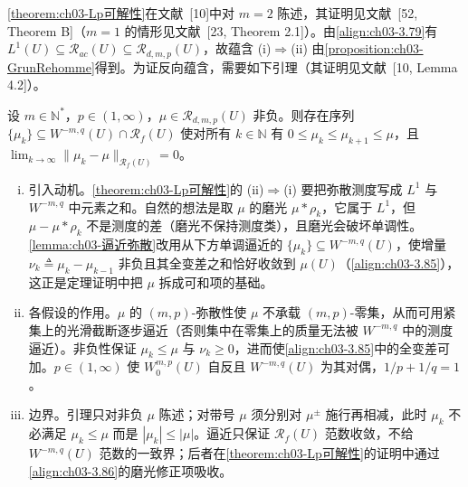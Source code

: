 \documentclass[../../main.tex]{subfiles}%
\begin{document}
\cref{theorem:ch03-Lp可解性}在文献~[10]中对 $m=2$ 陈述，其证明见文献~[52, Theorem B]（$m=1$ 的情形见文献~[23, Theorem 2.1]）。由\eqref{align:ch03-3.79}有 $L^1(U)\subseteq\mathscr{R}_{ac}(U)\subseteq\mathscr{R}_{d,m,p}(U)$，故蕴含 (i)$\Rightarrow$(ii) 由\cref{proposition:ch03-GrunRehomme}得到。为证反向蕴含，需要如下引理（其证明见文献~[10, Lemma 4.2]）。

\begin{lemma}\label{lemma:ch03-逼近弥散}
设 $m\in\mathbb{N}^*$，$p\in(1,\infty)$，$\mu\in\mathscr{R}_{d,m,p}(U)$ 非负。则存在序列 $\{\mu_k\}\subseteq W^{-m,q}(U)\cap\mathscr{R}_f(U)$ 使对所有 $k\in\mathbb{N}$ 有 $0\leqslant\mu_k\leqslant\mu_{k+1}\leqslant\mu$，且 $\lim_{k\to\infty}\|\mu_k-\mu\|_{\mathscr{R}_f(U)}=0$。
\end{lemma}

\begin{remark}\label{remark:ch03-逼近弥散动机}
\begin{enumerate}[(i)]
\item 引入动机。\cref{theorem:ch03-Lp可解性}的 (ii)$\Rightarrow$(i) 要把弥散测度写成 $L^1$ 与 $W^{-m,q}$ 中元素之和。自然的想法是取 $\mu$ 的磨光 $\mu*\rho_k$，它属于 $L^1$，但 $\mu-\mu*\rho_k$ 不是测度的差（磨光不保持测度类），且磨光会破坏单调性。\cref{lemma:ch03-逼近弥散}改用从下方单调逼近的 $\{\mu_k\}\subseteq W^{-m,q}(U)$，使增量 $\nu_k\triangleq\mu_k-\mu_{k-1}$ 非负且其全变差之和恰好收敛到 $\mu(U)$（\eqref{align:ch03-3.85}），这正是定理证明中把 $\mu$ 拆成可和项的基础。
\item 各假设的作用。$\mu$ 的 $(m,p)$-弥散性使 $\mu$ 不承载 $(m,p)$-零集，从而可用紧集上的光滑截断逐步逼近（否则集中在零集上的质量无法被 $W^{-m,q}$ 中的测度逼近）。非负性保证 $\mu_k\leqslant\mu$ 与 $\nu_k\geqslant0$，进而使\eqref{align:ch03-3.85}中的全变差可加。$p\in(1,\infty)$ 使 $W^{m,p}_0(U)$ 自反且 $W^{-m,q}(U)$ 为其对偶，$1/p+1/q=1$。
\item 边界。引理只对非负 $\mu$ 陈述；对带号 $\mu$ 须分别对 $\mu^\pm$ 施行再相减，此时 $\mu_k$ 不必满足 $\mu_k\leqslant\mu$ 而是 $|\mu_k|\leqslant|\mu|$。逼近只保证 $\mathscr{R}_f(U)$ 范数收敛，不给 $W^{-m,q}(U)$ 范数的一致界；后者在\cref{theorem:ch03-Lp可解性}的证明中通过\eqref{align:ch03-3.86}的磨光修正项吸收。
\end{enumerate}
\end{remark}
\end{document}
